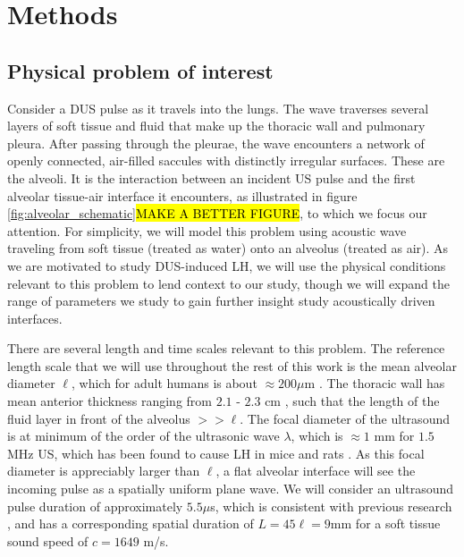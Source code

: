 \section{Methods} \label{sec:methods}%
\subsection{Physical problem of interest}
\label{subsec:physical_problem}
Consider a \ac{DUS} pulse as it travels into the lungs. The wave
traverses several layers of soft tissue and fluid that make up the
thoracic wall and pulmonary pleura. After passing through the pleurae,
the wave encounters a network of openly connected, air-filled saccules
with distinctly irregular surfaces. These are the alveoli. It is the
interaction between an incident \ac{US} pulse and the first alveolar
tissue-air interface it encounters, as illustrated in figure
\ref{fig:alveolar_schematic}\hl{MAKE A BETTER FIGURE}, to which we
focus our attention. For simplicity, we will model this problem using
acoustic wave traveling from soft tissue (treated as water) onto an
alveolus (treated as air). As we are motivated to study
\ac{DUS}-induced \ac{LH}, we will use the physical conditions relevant
to this problem to lend context to our study, though we will expand
the range of parameters we study to gain further insight study
acoustically driven interfaces.

There are several length and time scales relevant to this
problem. The reference length scale that we will use throughout the
rest of this work is the mean alveolar diameter $\ell$, which for
adult humans is about $\approx 200 \mu$m \citep{Ochs2004}. The
thoracic wall has mean anterior thickness ranging from $2.1$ - $2.3$
cm \cite{McLean2011}, such that the length of the fluid layer in front
of the alveolus $>>\ell$. The focal diameter of the ultrasound is at
minimum of the order of the ultrasonic wave $\lambda$, which is
$\approx 1$ mm for $1.5$ MHz \ac{US}, which has been found to cause
\ac{LH} in mice and rats \cite{Child1990,Miller2015a}. As this focal diameter is
appreciably larger than $\ell$, a flat alveolar interface will see the
incoming pulse as a spatially uniform plane wave. We will consider an
ultrasound pulse duration of approximately $5.5 \mu$s, which is
consistent with previous research \citep{Child1990}, and has a
corresponding spatial duration of $L=45\ell = 9$mm for a soft tissue sound
speed of $c=1649$ m/s. 

